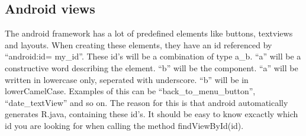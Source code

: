 \subsection{Android views}
The android framework has a lot of predefined elements like buttons, textviews
and layouts. When creating these elements, they have an id referenced by
``android:id= my\_id''. These id's will be a combination of type a\_b. ``a'' will be
a constructive word describing the element. ``b'' will be the component. ``a''
will be written in lowercase only, seperated with underscore. ``b'' will be in
lowerCamelCase. Examples of this can be ``back\_to\_menu\_button'',
``date\_textView'' and so on. The reason for this is that android automatically
generates R.java, containing these id's. It should be easy to know excactly
which id you are looking for when calling the method findViewById(id).
